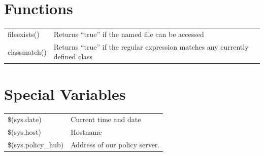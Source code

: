\section{Functions}

\begin{longtable}{|l|l|}
\hline
fileexists() & Returns ``true'' if the named file can be accessed\\
classmatch() & Returns ``true'' if the regular expression matches any currently defined class\\
\hline
\end{longtable}

\section{Special Variables}

\begin{longtable}{|l|l|}
\hline
\$(sys.date) & Current time and date\\
\$(sys.host) & Hostname\\
\$(sys.policy\_hub) & Address of our policy server.\\
\hline
\end{longtable}